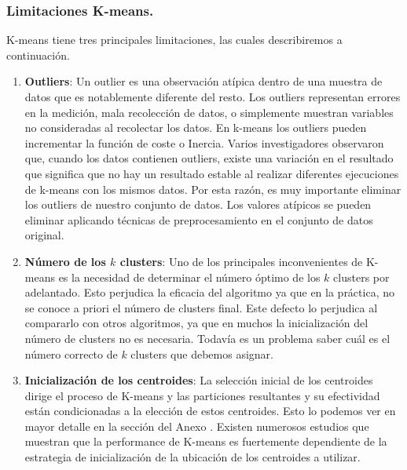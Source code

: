 \documentclass[12pt,a4paper]{article}
\begin{document}
\begin{sloppypar}
\cleardoublepage
\subsubsection{Limitaciones K-means.}\label{limit_kmeans}

K-means tiene tres principales limitaciones, las cuales describiremos a continuación.

\begin{enumerate}

\item \textbf{Outliers}: Un outlier es una observación atípica dentro de una muestra de datos que es notablemente diferente del resto. Los outliers representan errores en la medición, mala recolección de datos, o simplemente muestran variables no consideradas al recolectar los datos.
En k-means los outliers pueden incrementar la función de coste o Inercia. Varios investigadores observaron que, cuando los datos contienen outliers, existe una variación en el resultado que significa que no hay un resultado estable al realizar diferentes ejecuciones de k-means con los mismos datos\cite{K_means_review}. Por esta razón, es muy importante eliminar los outliers de nuestro conjunto de datos. Los valores atípicos se pueden eliminar aplicando técnicas de preprocesamiento en el conjunto de datos original.

\item \textbf{Número de los $k$ clusters}: Uno de los principales inconvenientes de K-means es la necesidad de determinar el número óptimo de los $k$ clusters por adelantado. Esto perjudica la eficacia del algoritmo ya que en la práctica, no se conoce a priori el número de clusters final. Este defecto lo perjudica al compararlo con otros algoritmos, ya que en muchos la inicialización del número de clusters no es necesaria. Todavía es un problema saber cuál es el número correcto de $k$ clusters que debemos asignar\cite{K_means_review}.

\item \textbf{Inicialización de los centroides}: La selección inicial de los centroides dirige el proceso de K-means y las particiones resultantes y su efectividad están condicionadas a la elección de estos centroides\cite{K_means_experiment}. Esto lo podemos ver en mayor detalle en la sección del Anexo \textit{}. Existen numerosos estudios\cite{K_means_initial_centroids} que muestran que la performance de K-means es fuertemente dependiente de la estrategia de inicialización de la ubicación de los centroides a utilizar.


\end{enumerate}
\end{sloppypar}
\end{document}
